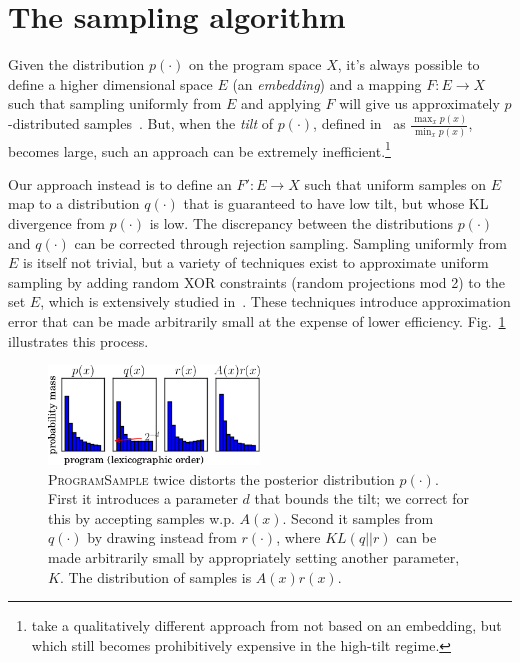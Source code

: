 \documentclass{article}
\newcommand{\theSystem}{\textsc{ProgramSample}}
\begin{document}
\section{The sampling algorithm}
Given the distribution $p(\cdot )$ on the program space $X$, it's
always possible to define a higher dimensional space $E$ (an
\emph{embedding}) and a mapping $F:E\to X$ such that sampling
uniformly from $E$ and applying $F$ will give us approximately
$p$-distributed samples~\cite{ermon2013embed}.
But, when the \emph{tilt} of $p(\cdot )$, defined
in~\cite{chakraborty2014distribution} as $\frac{\max_x p(x)}{\min_x p(x)}$,
becomes large, such an approach can be extremely
inefficient.\footnote{\cite{chakraborty2014distribution} take a qualitatively different approach from \cite{ermon2013embed} not based on an embedding, but which still becomes prohibitively expensive in the high-tilt regime.}

Our approach instead is to define an $F':E\to X$ such that uniform
samples on $E$ map to a distribution $q(\cdot )$ that is guaranteed to
have low tilt, but whose KL divergence from $p(\cdot )$ is low. The
discrepancy between the distributions $p(\cdot )$ and $q(\cdot )$ can
be corrected through rejection sampling. Sampling uniformly from $E$
is itself not trivial, but a variety of techniques exist to
approximate uniform sampling by adding random XOR constraints (random
projections mod 2) to the set $E$, which is extensively studied
in~\cite{gomes2006near,valiant1985np,chakraborty2014balancing,gomes2006model}.
These techniques introduce approximation error that can be made
arbitrarily small at the expense of lower
efficiency. Fig.~\ref{cartoon} illustrates this process.
\begin{figure}\vspace{-0.5cm}\centering
  \includegraphics[width=0.5\textwidth]{cartoon_small.png}
  \caption{\theSystem{} twice distorts the posterior distribution $p(\cdot )$. First it introduces a parameter $d$ that bounds the tilt; we correct for this by accepting samples w.p. $A(x)$. Second it samples from $q(\cdot )$ by drawing instead from $r(\cdot )$, where $KL(q||r)$ can be made arbitrarily small by appropriately setting another parameter, $K$. The distribution of samples is $A(x)r(x)$.}\label{cartoon}\vspace{-0.5cm}
\end{figure}
\end{document}
